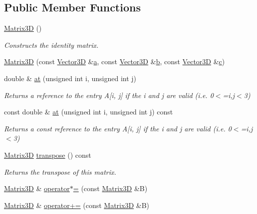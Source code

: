 \subsection*{Public Member Functions}
\begin{DoxyCompactItemize}
\item 
\mbox{\hyperlink{classlinalg_1_1Matrix3D_a868d0ba8d6ad2fcccc39c1633a5a854a}{Matrix3D}} ()
\begin{DoxyCompactList}\small\item\em Constructs the identity matrix. \end{DoxyCompactList}\item 
\mbox{\hyperlink{classlinalg_1_1Matrix3D_a3a7ce553d163d01e112c55a1afa712ca}{Matrix3D}} (const \mbox{\hyperlink{classVector3D}{Vector3D}} \&\mbox{\hyperlink{classlinalg_1_1Matrix3D_a33667283fe3c4bbac6d4f78eae2af3b6}{a}}, const \mbox{\hyperlink{classVector3D}{Vector3D}} \&\mbox{\hyperlink{classlinalg_1_1Matrix3D_acf0cd214420329fe18c902be95da0b23}{b}}, const \mbox{\hyperlink{classVector3D}{Vector3D}} \&\mbox{\hyperlink{classlinalg_1_1Matrix3D_abe82e945bf73f0d0f6f28c1749e2c7e3}{c}})
\item 
double \& \mbox{\hyperlink{classlinalg_1_1Matrix3D_a1021460c27da3f21690b68a2c7dea870}{at}} (unsigned int i, unsigned int j)
\begin{DoxyCompactList}\small\item\em Returns a reference to the entry A\mbox{[}i, j\mbox{]} if the i and j are valid (i.\+e. 0$<$=i,j$<$3) \end{DoxyCompactList}\item 
const double \& \mbox{\hyperlink{classlinalg_1_1Matrix3D_a69d8a6906f27a4b2890e3f3e61e544ca}{at}} (unsigned int i, unsigned int j) const
\begin{DoxyCompactList}\small\item\em Returns a const reference to the entry A\mbox{[}i, j\mbox{]} if the i and j are valid (i.\+e. 0$<$=i,j$<$3) \end{DoxyCompactList}\item 
\mbox{\hyperlink{classlinalg_1_1Matrix3D}{Matrix3D}} \mbox{\hyperlink{classlinalg_1_1Matrix3D_a37c503b2cd6d5633715e5c0d810cd30b}{transpose}} () const
\begin{DoxyCompactList}\small\item\em Returns the transpose of this matrix. \end{DoxyCompactList}\item 
\mbox{\hyperlink{classlinalg_1_1Matrix3D}{Matrix3D}} \& \mbox{\hyperlink{classlinalg_1_1Matrix3D_aff9083d3f737113ea70ca544bee86d8f}{operator$\ast$=}} (const \mbox{\hyperlink{classlinalg_1_1Matrix3D}{Matrix3D}} \&B)
\item 
\mbox{\hyperlink{classlinalg_1_1Matrix3D}{Matrix3D}} \& \mbox{\hyperlink{classlinalg_1_1Matrix3D_ae9c4b93227bc3cb85796ae377a476d2b}{operator+=}} (const \mbox{\hyperlink{classlinalg_1_1Matrix3D}{Matrix3D}} \&B)
\end{DoxyCompactItemize}
